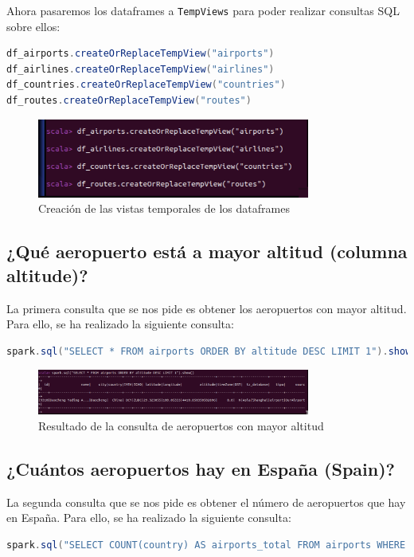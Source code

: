 Ahora pasaremos los dataframes a \texttt{TempViews} para poder realizar consultas SQL sobre ellos:

\begin{lstlisting}[language=scala]
df_airports.createOrReplaceTempView("airports")
df_airlines.createOrReplaceTempView("airlines")
df_countries.createOrReplaceTempView("countries")
df_routes.createOrReplaceTempView("routes")
\end{lstlisting}

\begin{figure}[H]
    \centering
    \includegraphics[width=0.8\textwidth]{figures/59.png}
    \caption{Creación de las vistas temporales de los dataframes}
    \label{fig:tempviews}
\end{figure}

\subsection{¿Qué aeropuerto está a mayor altitud (columna altitude)?}

La primera consulta que se nos pide es obtener los aeropuertos con mayor altitud. Para ello, se ha realizado la siguiente consulta:

\begin{lstlisting}[language=scala]
spark.sql("SELECT * FROM airports ORDER BY altitude DESC LIMIT 1").show()
\end{lstlisting}

\begin{figure}[H]
    \centering
    \includegraphics[width=0.8\textwidth]{figures/60.png}
    \caption{Resultado de la consulta de aeropuertos con mayor altitud}
    \label{fig:consulta1}
\end{figure}

\subsection{¿Cuántos aeropuertos hay en España (Spain)?}

La segunda consulta que se nos pide es obtener el número de aeropuertos que hay en España. Para ello, se ha realizado la siguiente consulta:

\begin{lstlisting}[language=scala]
spark.sql("SELECT COUNT(country) AS airports_total FROM airports WHERE country == 'Spain'").show()
\end{lstlisting}
